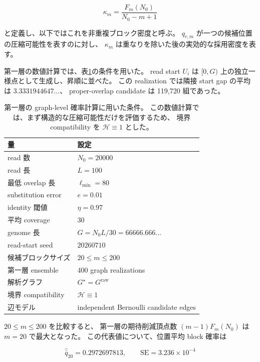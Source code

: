 \documentclass[a4j,10pt]{ujarticle}
\begin{document}
\begin{equation}
\kappa_m
=
\frac{F_m(N_0)}{N_0-m+1}
\label{eq:kappa_ch5}
\end{equation}

と定義し、以下ではこれを非重複ブロック密度と呼ぶ。
$q_{r,m}$ が一つの候補位置の圧縮可能性を表すのに対し、
$\kappa_m$ は重なりを除いた後の実効的な採用密度を表す。

第一層の数値計算では、表\ref{tab:probability_model_parameters}の条件を用いた。
read start $U_i$ は $[0,G)$ 上の独立一様点として生成し、昇順に並べた。
この realization では隣接 start gap の平均は $3.3331944647\ldots$、
proper-overlap candidate は 119,720 組であった。

\begin{table}[tbp]
\centering
\small
\renewcommand{\arraystretch}{1.18}
\begin{tabular}{|l|l|}
\hline
\textbf{量} & \textbf{設定} \\ \hline
read 数 & $N_0=20000$ \\ \hline
read 長 & $L=100$ \\ \hline
最低 overlap 長 & $\ell_{\min}=80$ \\ \hline
substitution error & $e=0.01$ \\ \hline
identity 閾値 & $\eta=0.97$ \\ \hline
平均 coverage & $30$ \\ \hline
genome 長 & $G=N_0L/30=66666.666\ldots$ \\ \hline
read-start seed & $20260710$ \\ \hline
候補ブロックサイズ & $20\le m\le200$ \\ \hline
第一層 ensemble & 400 graph realizations \\ \hline
解析グラフ & $G^\star=G^{\mathrm{raw}}$ \\ \hline
境界 compatibility & $\mathcal H\equiv1$ \\ \hline
辺モデル & independent Bernoulli candidate edges \\ \hline
\end{tabular}
\caption{
第一層の graph-level 確率計算に用いた条件。
この数値計算では、まず構造的な圧縮可能性だけを評価するため、
境界 compatibility を $\mathcal H\equiv1$ とした。
}
\label{tab:probability_model_parameters}
\end{table}

$20\le m\le200$ を比較すると、
第一層の期待削減頂点数 $(m-1)F_m(N_0)$ は $m=20$ で最大となった。
この代表値について、位置平均 block 確率は

\[
\widehat{\bar q}_{20}
=
0.2972697813,
\qquad
\mathrm{SE}=3.236\times10^{-4}
\]
\end{document}

